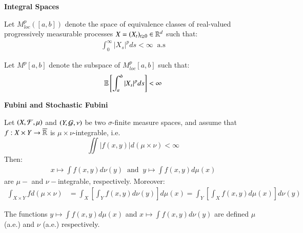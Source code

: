 \centerline{\textbf{Integral Spaces}}

\begin{definition}[$M^{p}_{loc}$]
Let $M_{loc}^{p}([a,b])$ denote the space of equivalence classes of real-valued progressively measurable processes $X = (X_{t})_{t\geq 0} \in \mathbb{R}^{d}$ such that: 
\begin{align*}
\int_{0}^{\infty}|X_{s}|^{p}ds < \infty \;\; \text{a.s}    
\end{align*}
\end{definition}

\begin{definition}[$M^{p}$]
Let $M^{p}[a,b]$ denote the subspace of $M^{p}_{loc}[a,b]$ such that: 
\begin{align*}
\mathbb{E}\left[
\int_{a}^{b}|X_{s}|^{p}ds
\right] < \infty   
\end{align*}
\end{definition}

\newpage 
\centerline{\textbf{Fubini and Stochastic Fubini}}
\label{thm: Fubini}
\begin{theorem}
Let $(X, \mathcal{F}, \mu)$ and $(Y, \mathcal{G}, \nu)$ be two $\sigma$-finite measure spaces, and assume that $f:X\times Y \to \overline{\mathbb{R}}$ is $\mu\times\nu$-integrable, i.e. 
\[
\iint |f(x,y)|d(\mu\times \nu) < \infty
\]
Then: 
\begin{align*}
x \mapsto \int f(x,y)d\nu(y) \;\;\text{and}\;\; y\mapsto \int f(x,y)d\mu(x)    
\end{align*}
are $\mu-$ and $\nu-$integrable, respectively. Moreover:
\begin{align*}
\int_{X\times Y} f d(\mu \times \nu) &=     
\int_{X} \left[
\int_{Y} f(x,y)d\nu(y)
\right]d\mu(x) 
= 
\int_{Y} \left[
\int_{X} f(x,y)d\mu(x)
\right]d\nu(y) 
\end{align*}

The functions $y \mapsto \int f(x,y)d\mu(x)$ and $x \mapsto \int f(x,y)d\nu(y)$ are defined $\mu$ (a.e.) and $\nu$ (a.e.) respectively. 
\end{theorem} 

